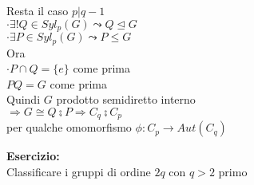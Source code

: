 \documentclass[12px]{article}
\begin{document}
\begin{dimo}
	Resta il caso $p | q-1$\\
	 $\cdot \exists ! Q\in Syl_p(G) \leadsto Q\trianglelefteq G$\\
	  $\cdot \exists P\in Syl_p(G)\leadsto P\leq G$\\
	  Ora\\
	  $\cdot P\cap Q = \{ e\}$ come prima\\
	   $PQ = G$ come prima\\
	   Quindi $G$ prodotto semidiretto interno\\
	   $ \Rightarrow G\cong Q\semi P \Rightarrow C_q \semi C_p$ \\
	   per qualche omomorfismo $\phi :C_p \rightarrow Aut(C_q)$
	\end{dimo}
	\textbf{Esercizio:}\\
	Classificare i gruppi di ordine $2q$ con  $q>2$ primo
\end{document}
